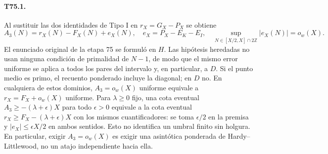 \documentclass[11pt,a4paper]{article}
\newcommand{\B}[2]{#2}
\newcommand{\B}[2]{#1}
\newcommand{\Z}{\mathbb Z}
\begin{document}
\paragraph{T75.1.}
\B{Substituting the two Type I identities into $r_X=G_X-P_X$ gives}{Al sustituir las dos identidades de Tipo I en $r_X=G_X-P_X$ se obtiene}
\begin{equation}\label{eq:transport}
 A_3(N)=r_X(N)-F_X(N)+e_X(N),\quad
 e_X=P_X-E_K-E_I,\quad
 \sup_{N\in[X/2,X]\cap 2\Z}|e_X(N)|=o_w(X).
\end{equation}
\B{The original stage 75 statement was made on $H$. The inherited hypotheses use no primality condition on $N-1$, so the same uniform error applies to all even targets in this interval, in particular to $D$. At a prime midpoint the weighted count includes the diagonal; on $D$ it does not. In any of these domains the assertion $A_3=o_w(X)$ uniformly is equivalent to $r_X=F_X+o_w(X)$ uniformly. For a fixed $\lambda\ge0$, an eventual lower bound $A_3\ge-(\lambda+\epsilon)X$ for every $\epsilon>0$ is equivalent to the eventual bound $r_X\ge F_X-(\lambda+\epsilon)X$ with the same quantifiers: use $\epsilon/2$ in the premise and $|e_X|\le\epsilon X/2$ in either direction. This does not identify a finite threshold without slack. In particular, demanding $A_3=o_w(X)$ is demanding a weighted Hardy--Littlewood asymptotic, not an independent shortcut to it.}{El enunciado original de la etapa 75 se formuló en $H$. Las hipótesis heredadas no usan ninguna condición de primalidad de $N-1$, de modo que el mismo error uniforme se aplica a todos los pares del intervalo y, en particular, a $D$. Si el punto medio es primo, el recuento ponderado incluye la diagonal; en $D$ no. En cualquiera de estos dominios, $A_3=o_w(X)$ uniforme equivale a $r_X=F_X+o_w(X)$ uniforme. Para $\lambda\ge0$ fijo, una cota eventual $A_3\ge-(\lambda+\epsilon)X$ para todo $\epsilon>0$ equivale a la cota eventual $r_X\ge F_X-(\lambda+\epsilon)X$ con los mismos cuantificadores: se toma $\epsilon/2$ en la premisa y $|e_X|\le\epsilon X/2$ en ambos sentidos. Esto no identifica un umbral finito sin holgura. En particular, exigir $A_3=o_w(X)$ es exigir una asintótica ponderada de Hardy--Littlewood, no un atajo independiente hacia ella.}
\end{document}
